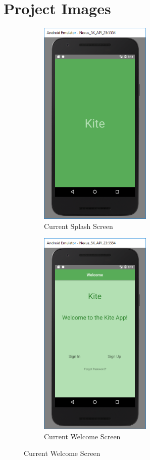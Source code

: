 \documentclass[compsoc, 10, draftclsnofoot, onecolumn]{IEEEtran}
\begin{document}
\section{Project Images}
\FloatBarrier
\begin{figure}[h]
\begin{subfigure}{0.5\textwidth}
\includegraphics[height=10cm]{Splash.PNG}
  \caption{Current Splash Screen}	
\end{subfigure}
\begin{subfigure}{0.5\textwidth}
  \includegraphics[height=10cm]{welcome.PNG}
  \caption{Current Welcome Screen}
\end{subfigure}
\end{figure}
\end{document}
